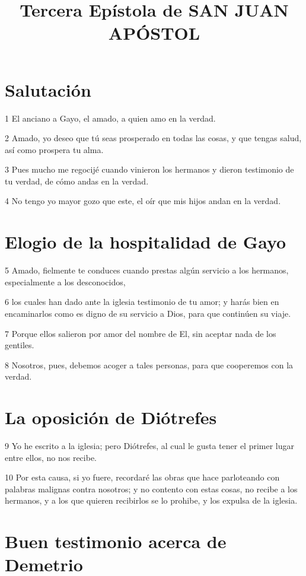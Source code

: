 
\title{Tercera Epístola de SAN JUAN APÓSTOL}

\section*{Salutación}

\par 1 El anciano a Gayo, el amado, a quien amo en la verdad.
\par 2 Amado, yo deseo que tú seas prosperado en todas las cosas, y que tengas salud, así como prospera tu alma.
\par 3 Pues mucho me regocijé cuando vinieron los hermanos y dieron testimonio de tu verdad, de cómo andas en la verdad.
\par 4 No tengo yo mayor gozo que este, el oír que mis hijos andan en la verdad.

\section*{Elogio de la hospitalidad de Gayo}

\par 5 Amado, fielmente te conduces cuando prestas algún servicio a los hermanos, especialmente a los desconocidos,
\par 6 los cuales han dado ante la iglesia testimonio de tu amor; y harás bien en encaminarlos como es digno de su servicio a Dios, para que continúen su viaje.
\par 7 Porque ellos salieron por amor del nombre de El, sin aceptar nada de los gentiles.
\par 8 Nosotros, pues, debemos acoger a tales personas, para que cooperemos con la verdad.

\section*{La oposición de Diótrefes}

\par 9 Yo he escrito a la iglesia; pero Diótrefes, al cual le gusta tener el primer lugar entre ellos, no nos recibe.
\par 10 Por esta causa, si yo fuere, recordaré las obras que hace parloteando con palabras malignas contra nosotros; y no contento con estas cosas, no recibe a los hermanos, y a los que quieren recibirlos se lo prohibe, y los expulsa de la iglesia.

\section*{Buen testimonio acerca de Demetrio}

